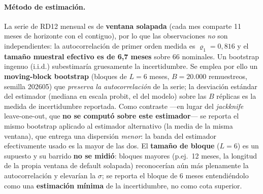 \documentclass[12pt, a4paper]{article}
\renewcommand{\rho}{\ensuremath{\varrho}}
\begin{document}
\paragraph{Método de estimación.} La serie de RD12 mensual es de \textbf{ventana solapada} (cada
mes comparte 11 meses de horizonte con el contiguo), por lo que las observaciones \emph{no} son
independientes: la autocorrelación de primer orden medida es $\rho_1=0{,}816$ y el
\textbf{tamaño muestral efectivo es de 6,7 meses} sobre 66 nominales. Un bootstrap ingenuo
(i.i.d.) subestimaría gruesamente la incertidumbre. Se emplea por ello un \textbf{moving-block
bootstrap} (bloques de $L=6$ meses, $B=20.000$ remuestreos, semilla 202605) que \emph{preserva la
autocorrelación} de la serie; la desviación estándar del estimador (mediana en escala probit, el
del modelo) sobre las $B$ réplicas es la medida de incertidumbre reportada. Como contraste ---en
lugar del \emph{jackknife} leave-one-out, que \textbf{no se computó sobre este estimador}--- se reporta
el mismo bootstrap aplicado al estimador alternativo (la media de la misma ventana), que entrega
una dispersión \emph{menor}: la banda del estimador efectivamente usado es la mayor de las dos. El
\textbf{tamaño de bloque} ($L=6$) es un supuesto y su barrido \textbf{no se midió}: bloques mayores
(p.ej.\ 12 meses, la longitud de la propia ventana de default solapada) reconocerían aún más
plenamente la autocorrelación y elevarían la $\sigma$; se reporta el bloque de 6 meses
entendiéndolo como una \textbf{estimación mínima} de la incertidumbre, no como cota superior.

\begin{table}[H]
\centering
\caption{Banda de incertidumbre del ancla LRA por nivel (estimador mediana, ventana LRA 54 meses)}
\label{tab:bandalra}
\small
{}
\end{table}
\end{document}
